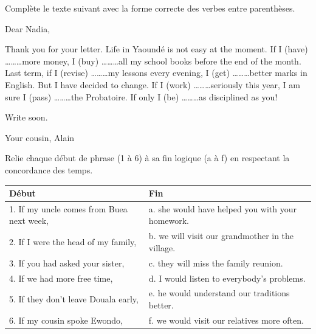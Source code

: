 \documentclass[11pt]{article}
\newcounter{popsec}
\newcounter{popsub}
\newcommand{\courssub}[1]{%
  \stepcounter{popsub}%
  \par\vspace{9pt}\noindent{\popxbold\fontsize{11.5}{13}\selectfont\color{popink}{\color{poporange}\thepopsec.\thepopsub}\hspace{6pt}#1}\par\nopagebreak\vspace{4pt}
}
\begin{document}
\begin{exercice}
Complète le texte suivant avec la forme correcte des verbes entre parenthèses.
\begin{textebox}
Dear Nadia,

Thank you for your letter. Life in Yaoundé is not easy at the moment. If I (have) \ldots\ldots\ldots more money, I (buy) \ldots\ldots\ldots all my school books before the end of the month. Last term, if I (revise) \ldots\ldots\ldots my lessons every evening, I (get) \ldots\ldots\ldots better marks in English. But I have decided to change. If I (work) \ldots\ldots\ldots seriously this year, I am sure I (pass) \ldots\ldots\ldots the Probatoire. If only I (be) \ldots\ldots\ldots as disciplined as you!

Write soon.

Your cousin, Alain
\end{textebox}
\end{exercice}

\begin{exercice}[Appariement]
Relie chaque début de phrase (1 à 6) à sa fin logique (a à f) en respectant la concordance des temps.
\begin{center}
\begin{tabularx}{\linewidth}{|X|X|}
\hline
\rowcolor{popblueL} Début & Fin \\
\hline
1. If my uncle comes from Buea next week, & a. she would have helped you with your homework. \\
\hline
2. If I were the head of my family, & b. we will visit our grandmother in the village. \\
\hline
3. If you had asked your sister, & c. they will miss the family reunion. \\
\hline
4. If we had more free time, & d. I would listen to everybody's problems. \\
\hline
5. If they don't leave Douala early, & e. he would understand our traditions better. \\
\hline
6. If my cousin spoke Ewondo, & f. we would visit our relatives more often. \\
\hline
\end{tabularx}
\end{center}
\end{exercice}

\courssub{Je me prépare au Bac}
\end{document}
